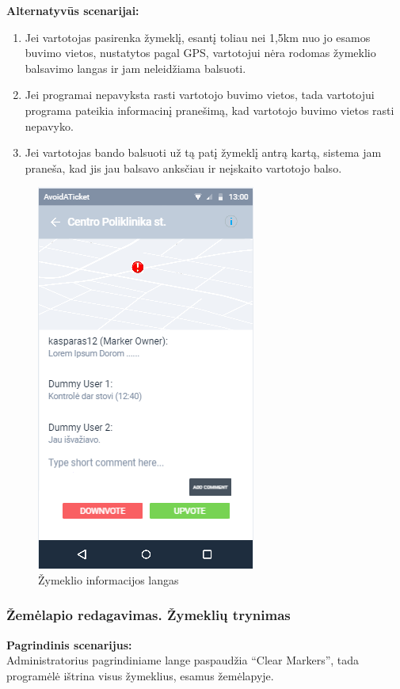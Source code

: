 \documentclass{VUMIFPSkursinis}
\begin{document}
	\textbf{Alternatyvūs scenarijai:}
	\begin{enumerate}
		\item Jei vartotojas pasirenka žymeklį, esantį toliau nei 1,5km nuo jo esamos buvimo vietos, nustatytos pagal GPS, vartotojui nėra rodomas žymeklio balsavimo langas ir jam neleidžiama balsuoti.
		\item Jei programai nepavyksta rasti vartotojo buvimo vietos, tada vartotojui programa pateikia informacinį pranešimą, kad vartotojo buvimo vietos rasti nepavyko.
		\item Jei vartotojas bando balsuoti už tą patį žymeklį antrą kartą, sistema jam praneša, kad jis jau balsavo anksčiau ir neįskaito vartotojo balso.
	\end{enumerate} 
	\begin{figure}[H]
				\centering
				\includegraphics[scale=0.6]{img/mockup_markerInfoWindow}
				\caption{Žymeklio informacijos langas}
				\label{img:Žymeklio informacijos langas}
			\end{figure}

\subsubsection{Žemėlapio redagavimas. Žymeklių trynimas}
	\textbf{Pagrindinis scenarijus:}\\
	Administratorius pagrindiniame lange paspaudžia “Clear Markers”, tada programėlė ištrina visus žymeklius, esamus žemėlapyje.
\end{document}
